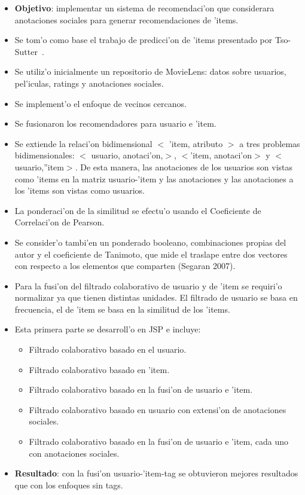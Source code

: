 \documentclass[11pt]{article}
\begin{document}
\begin{itemize}
\item \textbf{Objetivo}: implementar un sistema de recomendaci'on que considerara anotaciones sociales para generar recomendaciones de 'items.
\item Se tom'o como base el trabajo de predicci'on de 'items presentado por \linebreak Tso-Sutter~\cite{tagaware:tso}.
\item Se utiliz'o inicialmente un repositorio de MovieLens: datos sobre usuarios, pel'iculas, ratings y anotaciones sociales.
\item Se implement'o el enfoque de vecinos cercanos.
\item Se fusionaron los recomendadores para usuario e 'item.
\item Se extiende la relaci'on bidimensional $<$ 'item, atributo $>$ a tres problemas bidimensionales: $<$ usuario, anotaci'on,$>$, $<$'item, anotaci'on$>$ y $<$usuario,''item$>$. De esta manera, las anotaciones de los usuarios son vistas como 'items en la matriz usuario-'item y las anotaciones y las anotaciones a los 'items son vistas como usuarios.
\item La ponderaci'on de la similitud se efectu'o usando el Coeficiente de Correlaci'on de Pearson.
\item Se consider'o tambi'en un ponderado booleano, combinaciones propias del autor y el coeficiente de Tanimoto, que mide el traslape entre dos vectores con respecto a los elementos que comparten (Segaran 2007).
\item Para la fusi'on del filtrado colaborativo de usuario y de 'item se requiri'o normalizar ya que tienen distintas unidades. El filtrado de usuario se basa en frecuencia, el de 'item se basa en la similitud de los 'items.
\item Esta primera parte se desarroll'o en JSP e incluye:
	\begin{itemize}
		\item Filtrado colaborativo basado en el usuario.
		\item Filtrado colaborativo basado en 'item.
		\item Filtrado colaborativo basado en la fusi'on de usuario e 'item.
		\item Filtrado colaborativo basado en usuario con extensi'on de anotaciones sociales.
		\item Filtrado colaborativo basado en la fusi'on de usuario e 'item, cada uno con anotaciones sociales.
	\end{itemize}
\item \textbf{Resultado}: con la fusi'on usuario-'item-tag se obtuvieron mejores resultados que con los enfoques sin tags.
\end{itemize}
\end{document}
